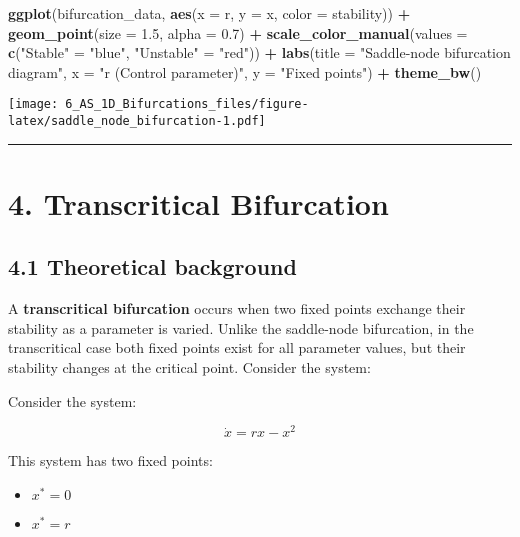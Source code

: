\documentclass[
]{article}
\newenvironment{Shaded}{\begin{snugshade}}{\end{snugshade}}
\newcommand{\AttributeTok}[1]{\textcolor[rgb]{0.13,0.29,0.53}{#1}}
\newcommand{\FloatTok}[1]{\textcolor[rgb]{0.00,0.00,0.81}{#1}}
\newcommand{\FunctionTok}[1]{\textcolor[rgb]{0.13,0.29,0.53}{\textbf{#1}}}
\newcommand{\NormalTok}[1]{#1}
\newcommand{\OtherTok}[1]{\textcolor[rgb]{0.56,0.35,0.01}{#1}}
\newcommand{\SpecialCharTok}[1]{\textcolor[rgb]{0.81,0.36,0.00}{\textbf{#1}}}
\newcommand{\StringTok}[1]{\textcolor[rgb]{0.31,0.60,0.02}{#1}}
\providecommand{\tightlist}{%
  \setlength{\itemsep}{0pt}\setlength{\parskip}{0pt}}
\begin{document}
\begin{Shaded}
\begin{Highlighting}[]
\FunctionTok{ggplot}\NormalTok{(bifurcation\_data, }\FunctionTok{aes}\NormalTok{(}\AttributeTok{x =}\NormalTok{ r, }\AttributeTok{y =}\NormalTok{ x, }\AttributeTok{color =}\NormalTok{ stability)) }\SpecialCharTok{+}
  \FunctionTok{geom\_point}\NormalTok{(}\AttributeTok{size =} \FloatTok{1.5}\NormalTok{, }\AttributeTok{alpha =} \FloatTok{0.7}\NormalTok{) }\SpecialCharTok{+}
  \FunctionTok{scale\_color\_manual}\NormalTok{(}\AttributeTok{values =} \FunctionTok{c}\NormalTok{(}\StringTok{"Stable"} \OtherTok{=} \StringTok{"blue"}\NormalTok{, }\StringTok{"Unstable"} \OtherTok{=} \StringTok{"red"}\NormalTok{)) }\SpecialCharTok{+}
  \FunctionTok{labs}\NormalTok{(}\AttributeTok{title =} \StringTok{"Saddle{-}node bifurcation diagram"}\NormalTok{, }
       \AttributeTok{x =} \StringTok{"r (Control parameter)"}\NormalTok{, }\AttributeTok{y =} \StringTok{"Fixed points"}\NormalTok{) }\SpecialCharTok{+}
  \FunctionTok{theme\_bw}\NormalTok{()}
\end{Highlighting}
\end{Shaded}

\texttt{[image: 6\_AS\_1D\_Bifurcations\_files/figure-latex/saddle\_node\_bifurcation-1.pdf]}

\begin{center}\rule{0.5\linewidth}{0.5pt}\end{center}

\section{4. Transcritical Bifurcation}\label{transcritical-bifurcation}

\subsection{\texorpdfstring{\textbf{4.1 Theoretical
background}}{4.1 Theoretical background}}\label{theoretical-background-3}

A \textbf{transcritical bifurcation} occurs when two fixed points
exchange their stability as a parameter is varied. Unlike the
saddle-node bifurcation, in the transcritical case both fixed points
exist for all parameter values, but their stability changes at the
critical point. Consider the system:

Consider the system:

\[
\dot{x} = rx - x^2
\]

This system has two fixed points:

\begin{itemize}
\tightlist
\item
  \(x^* = 0\)
\item
  \(x^* = r\)
\end{itemize}
\end{document}
